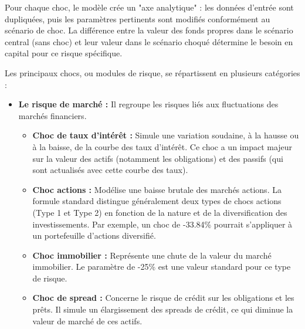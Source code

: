Pour chaque choc, le modèle crée un "axe analytique" : les données d'entrée sont dupliquées, puis les paramètres pertinents sont modifiés conformément au scénario de choc. La différence entre la valeur des fonds propres dans le scénario central (sans choc) et leur valeur dans le scénario choqué détermine le besoin en capital pour ce risque spécifique.

Les principaux chocs, ou modules de risque, se répartissent en plusieurs catégories :

\begin{itemize} 
    \item \textbf{Le risque de marché :} Il regroupe les risques liés aux fluctuations des marchés financiers. 
    \begin{itemize} 
        \item \textbf{Choc de taux d'intérêt :} Simule une variation soudaine, à la hausse ou à la baisse, de la courbe des taux d'intérêt. Ce choc a un impact majeur sur la valeur des actifs (notamment les obligations) et des passifs (qui sont actualisés avec cette courbe des taux). 
        \item \textbf{Choc actions :} Modélise une baisse brutale des marchés actions. La formule standard distingue généralement deux types de chocs actions (Type 1 et Type 2) en fonction de la nature et de la diversification des investissements. Par exemple, un choc de -33.84\% pourrait s'appliquer à un portefeuille d'actions diversifié. 
        \item \textbf{Choc immobilier :} Représente une chute de la valeur du marché immobilier. Le paramètre de -25\% est une valeur standard pour ce type de risque. 
        \item \textbf{Choc de spread :} Concerne le risque de crédit sur les obligations et les prêts. Il simule un élargissement des spreads de crédit, ce qui diminue la valeur de marché de ces actifs. 
    \end{itemize}


\end{itemize}
